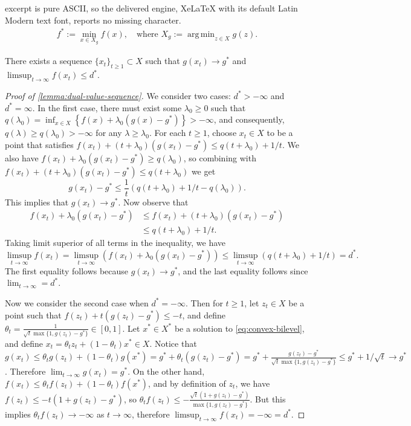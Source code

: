 \documentclass[10pt,a4paper]{amsart}
\DeclareMathOperator*{\argmin}{arg\,min}
\begin{document}
excerpt is pure ASCII, so the delivered engine, XeLaTeX with its default Latin Modern text font, reports no missing character.
\begin{equation}\label{eq:convex-bilevel}
    \begin{aligned}
        f^* := \min_{x\in X_g} f(x), \quad\text {where } X_g:= \argmin_{z\in X} g(z).
    \end{aligned}
\end{equation}

\begin{lemma}\label{lemma:dual-value-sequence}
There exists a sequence $\{x_t\}_{t \geq 1} \subset X$ such that $g(x_t) \to g^*$ and $\limsup_{t \to \infty} f(x_t) \leq d^*$.
\end{lemma}

\begin{proof}[Proof of \cref{lemma:dual-value-sequence}]
We consider two cases: $d^* > -\infty$ and $d^* = \infty$. In the first case, there must exist some $\lambda_0 \geq 0$ such that $q(\lambda_0) = \inf_{x \in X} \left\{ f(x) + \lambda_0 (g(x) - g^*) \right\} > -\infty$, and consequently, $q(\lambda) \geq q(\lambda_0) > -\infty$ for any $\lambda \geq \lambda_0$. For each $t \geq 1$, choose $x_t \in X$ to be a point that satisfies $f(x_t) + (t+\lambda_0) (g(x_t) - g^*) \leq q(t+\lambda_0) + 1/t$. We also have $f(x_t) + \lambda_0 (g(x_t) - g^*) \geq q(\lambda_0)$, so combining with $f(x_t) + (t+\lambda_0) (g(x_t) - g^*) \leq q(t+\lambda_0)$ we get
\[ g(x_t) - g^* \leq \frac{1}{t} \left( q(t+\lambda_0) + 1/t - q(\lambda_0) \right). \]
This implies that $g(x_t) \to g^*$. Now observe that
\begin{align*}
f(x_t) + \lambda_0 (g(x_t) - g^*) &\leq f(x_t) + (t+\lambda_0) (g(x_t) - g^*)\\
&\leq q(t+\lambda_0) + 1/t.
\end{align*}
Taking limit superior of all terms in the inequality, we have
\[ \limsup_{t \to \infty} f(x_t) = \limsup_{t \to \infty} \left( f(x_t) + \lambda_0 (g(x_t) - g^*) \right) \leq \limsup_{t \to \infty} \left( q(t+\lambda_0) + 1/t \right) = d^*. \]
The first equality follows because $g(x_t) \to g^*$, and the last equality follows since $\lim_{t \to \infty} = d^*$.

Now we consider the second case when $d^* = -\infty$. Then for $t \geq 1$, let $z_t \in X$ be a point such that $f(z_t) + t(g(z_t) - g^*) \leq -t$, and define $\theta_t = \frac{1}{\sqrt{t} \max\{1, g(z_t) - g^*\}} \in [0,1]$. Let $x^* \in X^*$ be a solution to \cref{eq:convex-bilevel}, and define $x_t = \theta_t z_t + (1-\theta_t) x^* \in X$. Notice that
$g(x_t) \leq \theta_t g(z_t) + (1-\theta_t) g(x^*) = g^* + \theta_t (g(z_t) - g^*) = g^* + \frac{g(z_t) - g^*}{\sqrt{t} \max\{1,g(z_t)-g^*\}} \leq g^* + 1/\sqrt{t} \to g^*$. Therefore $\lim_{t \to \infty} g(x_t) = g^*$. On the other hand, $f(x_t) \leq \theta_t f(z_t) + (1-\theta_t) f(x^*)$, and by definition of $z_t$, we have $f(z_t) \leq -t(1 + g(z_t) - g^*)$, so $\theta_t f(z_t) \leq -\frac{\sqrt{t} (1+g(z_t) - g^*)}{\max\{1,g(z_t)-g^*\}}$. But this implies $\theta_t f(z_t) \to -\infty$ as $t \to \infty$, therefore $\limsup_{t \to \infty} f(x_t) = -\infty = d^*$.
\end{proof}
\end{document}
